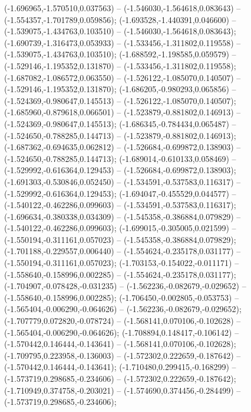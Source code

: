  (-1.696965,-1.570510,0.037563) -- (-1.546030,-1.564618,0.083643) -- (-1.554357,-1.701789,0.059856);
 (-1.693528,-1.440391,0.046600) -- (-1.539075,-1.434763,0.103510) -- (-1.546030,-1.564618,0.083643);
 (-1.690739,-1.316473,0.053933) -- (-1.533456,-1.311802,0.119558) -- (-1.539075,-1.434763,0.103510);
 (-1.688592,-1.198585,0.059579) -- (-1.529146,-1.195352,0.131870) -- (-1.533456,-1.311802,0.119558);
 (-1.687082,-1.086572,0.063550) -- (-1.526122,-1.085070,0.140507) -- (-1.529146,-1.195352,0.131870);
 (-1.686205,-0.980293,0.065856) -- (-1.524369,-0.980647,0.145513) -- (-1.526122,-1.085070,0.140507);
 (-1.685960,-0.879618,0.066501) -- (-1.523879,-0.881802,0.146913) -- (-1.524369,-0.980647,0.145513);
 (-1.686345,-0.784434,0.065487) -- (-1.524650,-0.788285,0.144713) -- (-1.523879,-0.881802,0.146913);
 (-1.687362,-0.694635,0.062812) -- (-1.526684,-0.699872,0.138903) -- (-1.524650,-0.788285,0.144713);
 (-1.689014,-0.610133,0.058469) -- (-1.529992,-0.616364,0.129453) -- (-1.526684,-0.699872,0.138903);
 (-1.691303,-0.530846,0.052450) -- (-1.534591,-0.537583,0.116317) -- (-1.529992,-0.616364,0.129453);
 (-1.694047,-0.455529,0.044577) -- (-1.540122,-0.462286,0.099603) -- (-1.534591,-0.537583,0.116317);
 (-1.696634,-0.380338,0.034309) -- (-1.545358,-0.386884,0.079829) -- (-1.540122,-0.462286,0.099603);
 (-1.699015,-0.305005,0.021599) -- (-1.550194,-0.311161,0.057023) -- (-1.545358,-0.386884,0.079829);
 (-1.701188,-0.229557,0.006440) -- (-1.554624,-0.235178,0.031177) -- (-1.550194,-0.311161,0.057023);
 (-1.703153,-0.154022,-0.011171) -- (-1.558640,-0.158996,0.002285) -- (-1.554624,-0.235178,0.031177);
 (-1.704907,-0.078428,-0.031235) -- (-1.562236,-0.082679,-0.029652) -- (-1.558640,-0.158996,0.002285);
 (-1.706450,-0.002805,-0.053753) -- (-1.565404,-0.006290,-0.064626) -- (-1.562236,-0.082679,-0.029652);
 (-1.707779,0.072820,-0.078724) -- (-1.568141,0.070106,-0.102628) -- (-1.565404,-0.006290,-0.064626);
 (-1.708894,0.148417,-0.106142) -- (-1.570442,0.146444,-0.143641) -- (-1.568141,0.070106,-0.102628);
 (-1.709795,0.223958,-0.136003) -- (-1.572302,0.222659,-0.187642) -- (-1.570442,0.146444,-0.143641);
 (-1.710480,0.299415,-0.168299) -- (-1.573719,0.298685,-0.234606) -- (-1.572302,0.222659,-0.187642);
 (-1.710949,0.374758,-0.203021) -- (-1.574690,0.374456,-0.284499) -- (-1.573719,0.298685,-0.234606);
